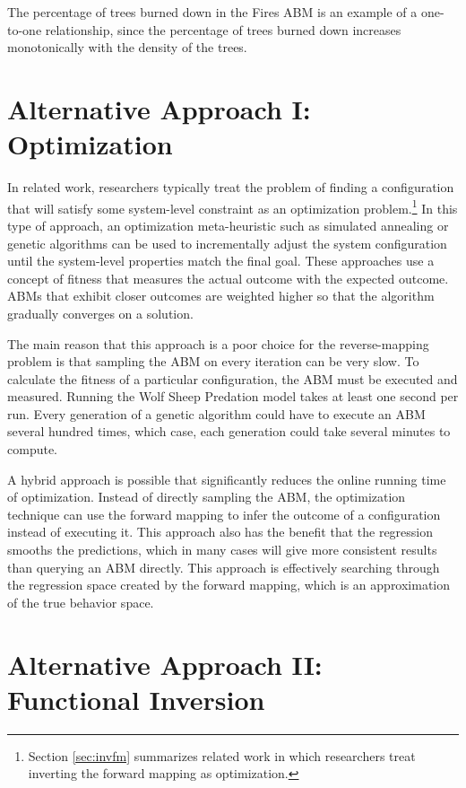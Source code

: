 The percentage of trees burned down in the Fires ABM is an example of a one-to-one relationship, since the percentage of trees burned down increases monotonically with the density of the trees.



\section{Alternative Approach I: Optimization}
In related work, researchers typically treat the problem of finding a configuration that will satisfy some system-level constraint as an optimization problem.\footnote{Section \ref{sec:invfm} summarizes related work in which researchers treat inverting the forward mapping as optimization.}
In this type of approach, an optimization meta-heuristic such as simulated annealing or genetic algorithms can be used to incrementally adjust the system configuration until the system-level properties match the final goal.
These approaches use a concept of fitness that measures the actual outcome with the expected outcome.
ABMs that exhibit closer outcomes are weighted higher so that the algorithm gradually converges on a solution.

The main reason that this approach is a poor choice for the reverse-mapping problem is that sampling the ABM on every iteration can be very slow.
To calculate the fitness of a particular configuration, the ABM must be executed and measured.
Running the Wolf Sheep Predation model takes at least one second per run.
Every generation of a genetic algorithm could have to execute an ABM several hundred times, which case, each generation could take several minutes to compute.

A hybrid approach is possible that significantly reduces the online running time of optimization.
Instead of directly sampling the ABM, the optimization technique can use the forward mapping to infer the outcome of a configuration instead of executing it.
This approach also has the benefit that the regression smooths the predictions, which in many cases will give more consistent results than querying an ABM directly.
This approach is effectively searching through the regression space created by the forward mapping, which is an approximation of the true behavior space.

\section{Alternative Approach II: Functional Inversion}\label{sec:functional}

